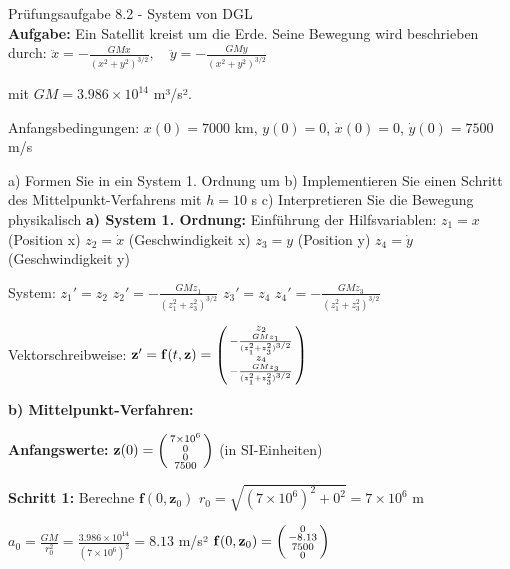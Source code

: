 \begin{example2}{Prüfungsaufgabe 8.2 - System von DGL}\\
\textbf{Aufgabe:} Ein Satellit kreist um die Erde. Seine Bewegung wird beschrieben durch:
$\ddot{x} = -\frac{GM x}{(x^2 + y^2)^{3/2}}, \quad \ddot{y} = -\frac{GM y}{(x^2 + y^2)^{3/2}}$

mit $GM = 3.986 \times 10^{14}$ m³/s².

Anfangsbedingungen: $x(0) = 7000$ km, $y(0) = 0$, $\dot{x}(0) = 0$, $\dot{y}(0) = 7500$ m/s

a) Formen Sie in ein System 1. Ordnung um
b) Implementieren Sie einen Schritt des Mittelpunkt-Verfahrens mit $h = 10$ s
c) Interpretieren Sie die Bewegung physikalisch
\tcblower
\textbf{a) System 1. Ordnung:}
Einführung der Hilfsvariablen:
$z_1 = x$ (Position x)
$z_2 = \dot{x}$ (Geschwindigkeit x)  
$z_3 = y$ (Position y)
$z_4 = \dot{y}$ (Geschwindigkeit y)

System:
$z_1' = z_2$
$z_2' = -\frac{GM z_1}{(z_1^2 + z_3^2)^{3/2}}$
$z_3' = z_4$  
$z_4' = -\frac{GM z_3}{(z_1^2 + z_3^2)^{3/2}}$

Vektorschreibweise:
$\mathbf{z}' = \mathbf{f}(t, \mathbf{z}) = \begin{psmallmatrix}
z_2 \\
-\frac{GM z_1}{(z_1^2 + z_3^2)^{3/2}} \\
z_4 \\
-\frac{GM z_3}{(z_1^2 + z_3^2)^{3/2}}
\end{psmallmatrix}$

\textbf{b) Mittelpunkt-Verfahren:}

\textbf{Anfangswerte:} $\mathbf{z}(0) = \begin{psmallmatrix} 7 \times 10^6 \\ 0 \\ 0 \\ 7500 \end{psmallmatrix}$ (in SI-Einheiten)

\textbf{Schritt 1:} Berechne $\mathbf{f}(0, \mathbf{z}_0)$
$r_0 = \sqrt{(7 \times 10^6)^2 + 0^2} = 7 \times 10^6$ m

$a_0 = \frac{GM}{r_0^2} = \frac{3.986 \times 10^{14}}{(7 \times 10^6)^2} = 8.13$ m/s²
$\mathbf{f}(0, \mathbf{z}_0) = \begin{psmallmatrix} 0 \\ -8.13 \\ 7500 \\ 0 \end{psmallmatrix}$


\end{example2}

